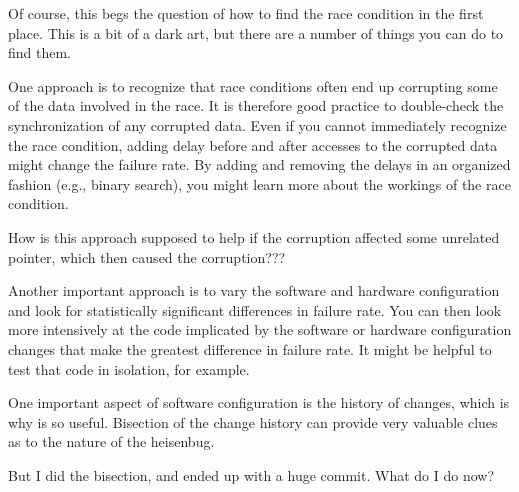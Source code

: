 Of course, this begs the question of how to find the race condition in
the first place.
This is a bit of a dark art, but there are a number of things you can
do to find them.

One approach is to recognize that race conditions often end up corrupting
some of the data involved in the race.
It is therefore good practice to double-check the synchronization of
any corrupted data.
Even if you cannot immediately recognize the race condition, adding
delay before and after accesses to the corrupted data might change
the failure rate.
By adding and removing the delays in an organized fashion (e.g., binary
search), you might learn more about the workings of the race condition.

\QuickQuiz{}
	How is this approach supposed to help if the corruption affected some
	unrelated pointer, which then caused the corruption???
 \QuickQuizEnd

Another important approach is to
vary the software and hardware configuration and look for statistically
significant differences in failure rate.
You can then look more intensively at the code implicated by the
software or hardware configuration changes that make the greatest
difference in failure rate.
It might be helpful to test that code in isolation, for example.

One important aspect of software configuration is the history of
changes, which is why  is so useful.
Bisection of the change history can provide very valuable clues as
to the nature of the heisenbug.

\QuickQuiz{}
	But I did the bisection, and ended up with a huge commit.
	What do I do now?
 \QuickQuizEnd

